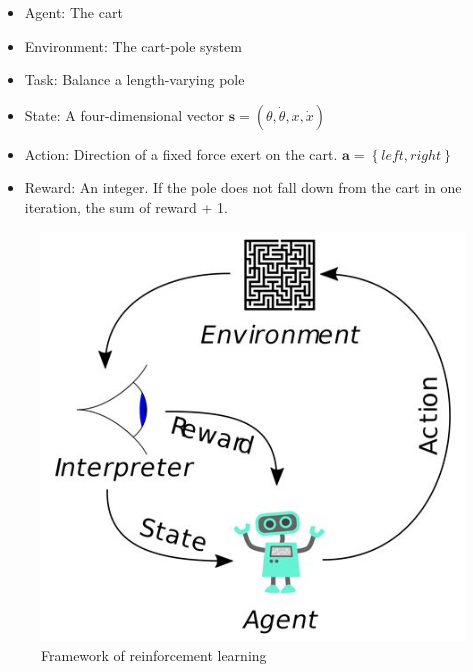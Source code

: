 \documentclass[10pt,a4paper]{article}
\begin{document}
\begin{itemize}
	\item Agent: The cart
	\item Environment: The cart-pole system
	\item Task: Balance a length-varying pole
	\item State: A four-dimensional vector $\boldsymbol{s} = (\theta, \dot{\theta}, x, \dot{x})$
	\item Action: Direction of a fixed force exert on the cart. $\boldsymbol{a} = \left\{ left, right\right\}$
	\item Reward: An integer. If the pole does not fall down from the cart in one iteration, the sum of reward + 1. 
\end{itemize}



 
\begin{figure}
\centering
\includegraphics[width=0.3\linewidth]{figure/rl}
\caption{Framework of reinforcement learning}
\label{fig:rl}
\end{figure}



%
%
\end{document}
